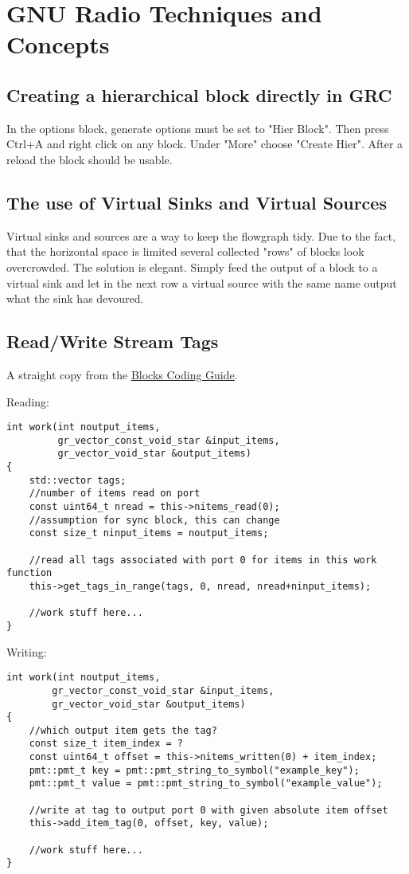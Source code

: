 \documentclass{article}
\begin{document}
\section{GNU Radio Techniques and Concepts}

\subsection{Creating a hierarchical block directly in GRC}

In the options block, generate options must be set to "Hier Block". Then press Ctrl+A and right click on any block. Under "More" choose "Create Hier". After a reload the block should be usable.

\subsection{The use of Virtual Sinks and Virtual Sources}

Virtual sinks and sources are a way to keep the flowgraph tidy. Due to the fact, that the horizontal space is limited several collected "rows" of blocks look overcrowded. The solution is elegant. Simply feed the output of a block to a virtual sink and let in the next row a virtual source with the same name output what the sink has devoured.

\subsection{Read/Write Stream Tags}

A straight copy from the \href{https://wiki.gnuradio.org/index.php/BlocksCodingGuide}{Blocks Coding Guide}.

\bigskip

Reading:
\begin{verbatim}
int work(int noutput_items,
         gr_vector_const_void_star &input_items,
         gr_vector_void_star &output_items)
{
	std::vector tags;
	//number of items read on port
	const uint64_t nread = this->nitems_read(0);
	//assumption for sync block, this can change
	const size_t ninput_items = noutput_items; 
	
	//read all tags associated with port 0 for items in this work function
	this->get_tags_in_range(tags, 0, nread, nread+ninput_items);
	
	//work stuff here...
}
\end{verbatim}

\bigskip

Writing:
\begin{verbatim}
int work(int noutput_items,
		gr_vector_const_void_star &input_items,
		gr_vector_void_star &output_items)
{
	//which output item gets the tag?
	const size_t item_index = ? 
	const uint64_t offset = this->nitems_written(0) + item_index;
	pmt::pmt_t key = pmt::pmt_string_to_symbol("example_key");
	pmt::pmt_t value = pmt::pmt_string_to_symbol("example_value");
	
	//write at tag to output port 0 with given absolute item offset
	this->add_item_tag(0, offset, key, value);
	
	//work stuff here...
}
\end{verbatim}
\end{document}
